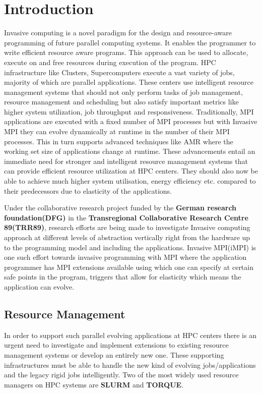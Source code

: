 \documentclass{acm_proc_article-sp}
\begin{document}
\section{Introduction}
Invasive computing is a novel paradigm for the design and resource-aware programming of future parallel computing systems. It enables the programmer to write efficient resource aware programs. This approach can be used to allocate, execute on and free resources during execution of the program. HPC infrastructure like Clusters, Supercomputers execute a vast variety of jobs, majority of which are parallel applications. These centers use intelligent resource management systems that should not only perform tasks of job management, resource management and scheduling but also satisfy important metrics like higher system utilization, job throughput and responsiveness. Traditionally, MPI applications are executed with a fixed number of MPI processes but with Invasive MPI they can evolve dynamically at runtime in the number of their MPI processes. This in turn supports advanced techniques like AMR where the working set size of applications change at runtime. These advancements entail an immediate need for stronger and intelligent resource management systems that can provide efficient resource utilization at HPC centers. They should also now be able to achieve much higher system utilisation, energy efficiency etc. compared to their predecessors due to elasticity of the applications.\par
\noindent
Under the collaborative research project funded by the \textbf{German research foundation(DFG)} in the \textbf{Transregional Collaborative Research Centre 89(TRR89)}, research efforts\cite{andreas} are being made to investigate Invasive computing approach at different levels of abstraction vertically right from the hardware up to the programming model and including the applications. Invasive MPI(iMPI)\cite{isaias} is one such effort towards invasive programming with MPI where the application programmer has MPI extensions available using which one can specify at certain safe points in the program, triggers that allow for elasticity which means the application can evolve.

\subsection{Resource Management}
In order to support such parallel evolving applications at HPC centers there is an urgent need to investigate and implement extensions to existing resource management systems or develop an entirely new one. These supporting infrastructures must be able to handle the new kind of evolving jobs/applications and the legacy rigid jobs intelligently. Two of the most widely used resource managers on HPC systems are \textbf{SLURM}\cite{slurm}\cite{jette} and \textbf{TORQUE}\cite{torque}. 
\end{document}
